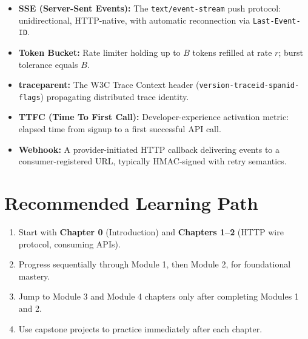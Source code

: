 \documentclass[12pt, a4paper, twoside, openright]{book}
\theoremstyle{definition}
\theoremstyle{remark}
\begin{document}
\begin{itemize}
  \item \textbf{SSE (Server-Sent Events):} The \texttt{text/event-stream} push protocol: unidirectional, HTTP-native, with automatic reconnection via \texttt{Last-Event-ID}.
  \item \textbf{Token Bucket:} Rate limiter holding up to $B$ tokens refilled at rate $r$; burst tolerance equals $B$.
  \item \textbf{traceparent:} The W3C Trace Context header (\texttt{version-traceid-spanid-flags}) propagating distributed trace identity.
  \item \textbf{TTFC (Time To First Call):} Developer-experience activation metric: elapsed time from signup to a first successful API call.
  \item \textbf{Webhook:} A provider-initiated HTTP callback delivering events to a consumer-registered URL, typically HMAC-signed with retry semantics.
\end{itemize}

\section{Recommended Learning Path}

\begin{enumerate}
  \item Start with \textbf{Chapter 0} (Introduction) and \textbf{Chapters 1--2} (HTTP wire protocol, consuming APIs).
  \item Progress sequentially through Module 1, then Module 2, for foundational mastery.
  \item Jump to Module 3 and Module 4 chapters only after completing Modules 1 and 2.
  \item Use capstone projects to practice immediately after each chapter.
\end{enumerate}



\printbibliography
\end{document}
